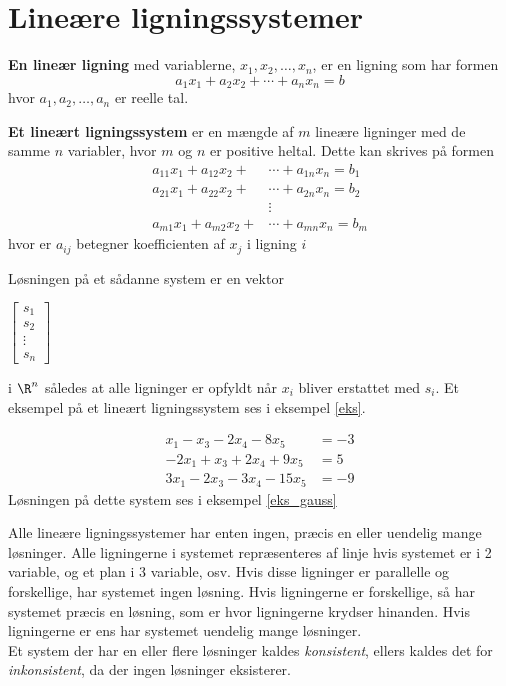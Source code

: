\section{Lineære ligningssystemer }
%

\textbf{En lineær ligning} med variablerne, $x_1,x_2,\ldots ,x_n$, er en ligning som har formen
$$ a_1x_1+a_2x_2+\cdots+a_nx_n=b$$ 
hvor $a_1,a_2,\ldots,a_n$ er reelle tal. 

\begin{defn}{}{}
\textbf{Et lineært ligningssystem} er en mængde af $m$ lineære ligninger  med de samme $n$ variabler, hvor $m$ og $n$ er positive heltal.
Dette kan skrives på formen
\begin{align*}
a_{11}x_1+a_{12}x_2+&\cdots+a_{1n}x_n=b_1\\
a_{21}x_1+a_{22}x_2+&\cdots+a_{2n}x_n=b_2\\
&\vdots\\
a_{m1}x_1+a_{m2}x_2+&\cdots +a_{mn}x_n=b_m
\end{align*}
hvor er $a_{ij}$ betegner koefficienten af $x_j$ i ligning $i$
\end{defn}
\noindent
Løsningen på et sådanne system er en vektor
\begin{center}
$\begin{bmatrix}
s_1\\
s_2\\
\vdots\\
s_n
\end{bmatrix}
$
\end{center}
i $\R ^n$ således at alle ligninger er opfyldt når $x_i$ bliver erstattet med $s_i$. Et eksempel på et lineært ligningssystem ses i eksempel \ref{eks}.
\begin{eks}\label{eks}
\begin{align*}
x_1-x_3-2x_4-8x_5&=-3 \\
-2x_1+x_3+2x_4+9x_5&=5 \\
3x_1-2x_3-3x_4-15x_5&=-9
\end{align*}
Løsningen på dette system ses i eksempel \ref{eks_gauss}
\end{eks}
Alle lineære ligningssystemer har enten ingen, præcis en eller uendelig mange løsninger.
Alle ligningerne i systemet repræsenteres af linje hvis systemet er i 2 variable, og et plan i 3 variable, osv.
Hvis disse ligninger er parallelle og forskellige, har systemet ingen løsning.
Hvis ligningerne er forskellige, så har systemet præcis en løsning, som er hvor ligningerne krydser hinanden. 
Hvis ligningerne er ens har systemet uendelig mange løsninger.\\
Et system der har en eller flere løsninger kaldes \textit{konsistent}, ellers kaldes det for \textit{inkonsistent}, da der ingen løsninger eksisterer.

